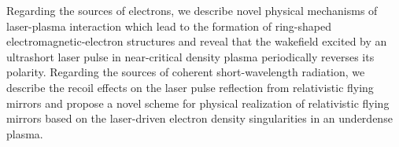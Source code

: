 \documentclass[10pt, a4paper, twoside, openright]{report}
\begin{document}
Regarding the sources of electrons, we describe novel physical mechanisms of laser-plasma interaction which lead to the formation of ring-shaped electromagnetic-electron structures and reveal that the wakefield excited by an ultrashort laser pulse in near-critical density plasma periodically reverses its polarity. Regarding the sources of coherent short-wavelength radiation, we describe the recoil effects on the laser pulse reflection from relativistic flying mirrors and propose a novel scheme for physical realization of relativistic flying mirrors based on the laser-driven electron density singularities in an underdense plasma. \\




\clearpage
\pagestyle{myfancy}
\tableofcontents



\end{document}
